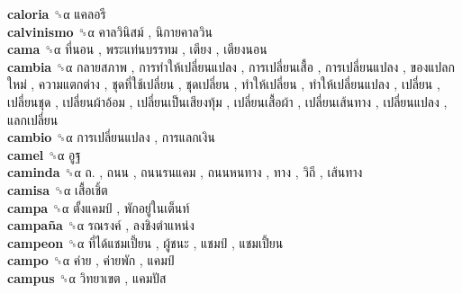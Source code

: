 \textbf{caloria} ␝α   แคลอรี   \\
\textbf{calvinismo} ␝α   คาลวินิสม์ ,  นิกายคาลวิน   \\
\textbf{cama} ␝α   ที่นอน ,  พระแท่นบรรทม ,  เตียง ,  เตียงนอน   \\
\textbf{cambia} ␝α   กลายสภาพ ,  การทำให้เปลี่ยนแปลง ,  การเปลี่ยนเสื้อ ,  การเปลี่ยนแปลง ,  ของแปลกใหม่ ,  ความแตกต่าง ,  ชุดที่ใช้เปลี่ยน ,  ชุดเปลี่ยน ,  ทำให้เปลี่ยน ,  ทำให้เปลี่ยนแปลง ,  เปลี่ยน ,  เปลี่ยนชุด ,  เปลี่ยนผ้าอ้อม ,  เปลี่ยนเป็นเสียงทุ้ม ,  เปลี่ยนเสื้อผ้า ,  เปลี่ยนเส้นทาง ,  เปลี่ยนแปลง ,  แลกเปลี่ยน   \\
\textbf{cambio} ␝α   การเปลี่ยนแปลง ,  การแลกเงิน   \\
\textbf{camel} ␝α   อูฐ   \\
\textbf{caminda} ␝α   ถ. ,  ถนน ,  ถนนรนแคม ,  ถนนหนทาง ,  ทาง ,  วิถี ,  เส้นทาง   \\
\textbf{camisa} ␝α   เสื้อเชิ้ต   \\
\textbf{campa} ␝α   ตั้งแคมป์ ,  พักอยู่ในเต็นท์   \\
\textbf{campaña} ␝α   รณรงค์ ,  ลงชิงตำแหน่ง   \\
\textbf{campeon} ␝α   ที่ได้แชมเปี้ยน ,  ผู้ชนะ ,  แชมป์ ,  แชมเปี้ยน   \\
\textbf{campo} ␝α   ค่าย ,  ค่ายพัก ,  แคมป์   \\
\textbf{campus} ␝α   วิทยาเขต ,  แคมปัส   \\
